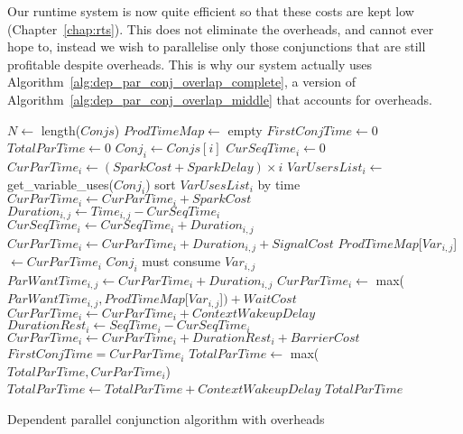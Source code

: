 Our runtime system is now quite efficient so that these
costs are kept low (Chapter~\ref{chap:rts}).
This does not eliminate the overheads, and cannot ever hope to,
instead we wish to parallelise only those conjunctions that are still
profitable despite overheads.
This is why our system actually uses
Algorithm~\ref{alg:dep_par_conj_overlap_complete},
a version of Algorithm~\ref{alg:dep_par_conj_overlap_middle}
that accounts for overheads.

\begin{algorithm}[tbp]
\begin{algorithmic}[1]
    \State $N \gets$ length($Conjs$)
    \State $ProdTimeMap \gets$ empty
    \State $FirstConjTime \gets 0$
    \State $TotalParTime \gets 0$
        \State $Conj_i \gets Conjs[i]$
        \State $CurSeqTime_i \gets 0$
        \State $CurParTime_i \gets (SparkCost + SparkDelay) \times i$
        \State $VarUsersList_i \gets$ get\_variable\_uses($Conj_i$)
        \State sort $VarUsesList_i$ by time
            \State $CurParTime_i \gets CurParTime_i + SparkCost$
        \EndIf
            \State $Duration_{i, j} \gets Time_{i, j} - CurSeqTime_i$
            \State $CurSeqTime_i \gets CurSeqTime_i + Duration_{i, j}$
                \State $CurParTime_i \gets
                    CurParTime_i + Duration_{i, j} + SignalCost$
                \State $ProdTimeMap$[$Var_{i, j}$]$ \gets CurParTime_i$
            \Else
                \Comment $Conj_i$ must consume $Var_{i, j}$
                \State $ParWantTime_{i, j} \gets CurParTime_i + Duration_{i, j}$
                \State $CurParTime_i \gets$
                    max($ParWantTime_{i, j}, ProdTimeMap$[$Var_{i, j}$]$) + WaitCost$
                    \State $CurParTime_i \gets CurParTime_i + ContextWakeupDelay$
                \EndIf
            \EndIf
        \EndFor
        \State $DurationRest_i \gets SeqTime_i - CurSeqTime_i$
        \State $CurParTime_i \gets CurParTime_i + DurationRest_i + BarrierCost$
            \State $FirstConjTime = CurParTime_i$
        \EndIf
        \State $TotalParTime \gets$ max($TotalParTime, CurParTime_i$)
    \EndFor
        \State $TotalParTime \gets TotalParTime + ContextWakeupDelay$
    \EndIf
    \State \Return $TotalParTime$
\EndProcedure
\end{algorithmic}
\caption{Dependent parallel conjunction algorithm with overheads}
\label{alg:dep_par_conj_overlap_complete}
\end{algorithm}


